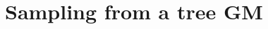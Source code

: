 \documentclass[11pt]{extarticle}
\newcommand{\0}{\mathbf{0}}
\renewcommand{\(}{\left(}
\renewcommand{\)}{\right)}
\theoremstyle{definition}
\begin{document}
\section{Sampling from a tree GM}
\end{document}
